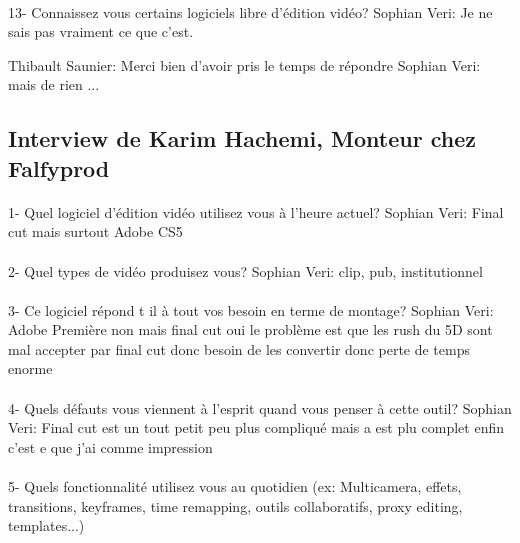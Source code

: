 \paragraph{}
13- Connaissez vous certains logiciels libre d'édition vidéo?
Sophian Veri: Je ne sais pas vraiment ce que c'est.

Thibault Saunier: Merci bien d'avoir pris le temps de répondre
Sophian Veri: mais de rien
...

\subsection {Interview de Karim Hachemi, Monteur chez Falfyprod}

\paragraph{}
1-  Quel logiciel d'édition vidéo utilisez vous à l'heure actuel?
Sophian Veri: Final cut mais surtout Adobe CS5

\paragraph{}
2- Quel types de vidéo produisez vous?
Sophian Veri: clip, pub, institutionnel

\paragraph{}
3- Ce logiciel répond t il à tout vos besoin en terme de montage?
Sophian Veri: Adobe Première non mais final cut oui le problème est que les
rush du 5D sont mal accepter par final cut donc besoin de les
convertir donc perte de temps enorme

\paragraph{}
4- Quels défauts vous viennent à l'esprit quand vous penser à cette outil?
Sophian Veri: Final cut est un tout petit peu plus compliqué mais a
est plu complet enfin c'est e que j'ai comme impression


\paragraph{}
5-  Quels fonctionnalité utilisez vous au quotidien (ex: Multicamera, effets,
transitions, keyframes, time remapping, outils collaboratifs, proxy
editing, templates...)

